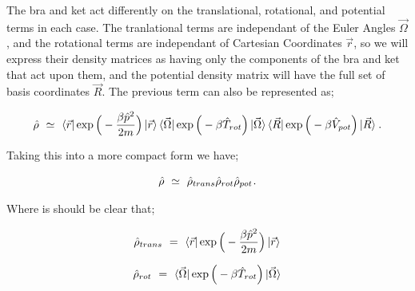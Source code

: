 \documentclass{article}
\begin{document}
The bra and ket act differently on the translational, rotational, and potential terms in each case. The tranlational terms are independant of the Euler Angles \begin{math} \vec{\Omega} \end{math}, and the rotational terms are independant of Cartesian Coordinates \begin{math} \vec{r} \end{math}, so we will express their density matrices as having only the components of the bra and ket that act upon them, and the potential density matrix will have the full set of basis coordinates \begin{math} \vec{R} \end{math}. The previous term can also be represented as;

\begin{equation} \label{eq:1}
\hat{\rho} \hspace{0.125cm} \simeq \hspace{0.125cm} \bra{\vec{r}} \exp \Big( - \frac{\beta \hat{p}^2}{2 m} \Big) \ket{\vec{r}} \bra{\vec{\Omega}} \exp \Big( - \beta \hat{T}_{rot} \Big) \ket{\vec{\Omega}} \bra{\vec{R}} \exp \Big( - \beta \hat{V}_{pot} \Big) \ket{\vec{R}} \hspace{0.025cm} . \end{equation}

Taking this into a more compact form we have;

\begin{equation} \label{eq:1}
\hat{\rho} \hspace{0.125cm} \simeq \hspace{0.125cm} \hat{\rho}_{trans} \hat{\rho}_{rot} \hat{\rho}_{pot} \hspace{0.025cm} .
\end{equation}

Where is should be clear that;

\begin{equation} \label{eq:1}
\hat{\rho}_{trans} \hspace{0.125cm} = \hspace{0.125cm} \bra{\vec{r}} \exp \Big( - \frac{\beta \hat{p}^2}{2 m} \Big) \ket{\vec{r}} \hspace{0.025cm} 
\end{equation}

\begin{equation} \label{eq:1}
\hat{\rho}_{rot} \hspace{0.125cm} = \hspace{0.125cm} \bra{\vec{\Omega}} \exp \Big( - \beta \hat{T}_{rot} \Big) \ket{\vec{\Omega}} \hspace{0.025cm} 
\end{equation}
\end{document}
